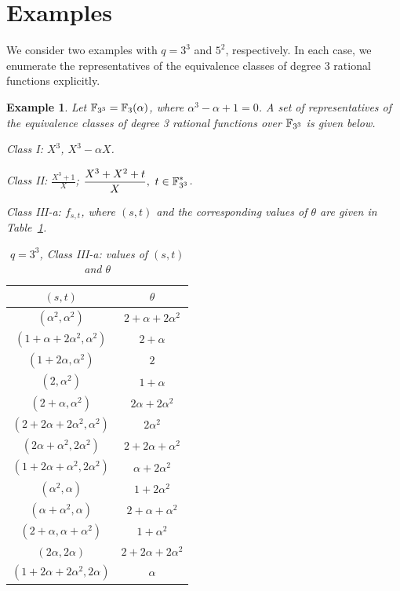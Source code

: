 \documentclass{amsart}
\newtheorem{exmp}[thm]{Example}
\numberwithin{equation}{section}
\theoremstyle{definition}
\newcommand{\f}{\Bbb F}
\newcommand{\A}{\alpha}
\begin{document}
\section{Examples}

We consider two examples with $q=3^3$ and $5^2$, respectively. In each case, we enumerate the representatives of the equivalence classes of degree 3 rational functions explicitly.

\begin{exmp}\rm
Let $\f_{3^3}=\f_3(\alpha)$, where $\alpha^3-\alpha+1=0$. A set of representatives of the equivalence classes of degree 3 rational functions over $\f_{3^3}$ is given below.

\medskip
Class I: $X^3$, $X^3-\alpha X$.

\medskip
Class II: $\displaystyle\frac{X^3+1}X$;  $\displaystyle\frac{X^3+X^2+t}X,\ t\in\f_{3^3}^*$.

\medskip
Class III-a: $f_{s,t}$, where $(s,t)$ and the corresponding values of $\theta$ are given in Table~\ref{tb:3^3-case3a}.

\begin{table}[ht]
\caption{$q=3^3$, Class III-a: values of $(s,t)$ and $\theta$}\label{tb:3^3-case3a}
   \renewcommand*{\arraystretch}{1.4}
    \centering
     \begin{tabular}{c|c}
         \hline
         $(s,t)$ & $\theta$ \\ \hline
        $(\A^2, \A^2)$ & $2 + \A + 2 \A^2$  \\
        $(1 + \A + 2 \A^2, \A^2)$ & $2 + \A$  \\
        $(1 + 2 \A, \A^2)$ & $2$ \\
        $(2, \A^2)$ & $1 + \A$ \\
        $(2 + \A, \A^2)$ & $2 \A + 2 \A^2$ \\
        $(2 + 2 \A + 2 \A^2, \A^2)$ & $ 2 \A^2$ \\
        $(2 \A + \A^2, 2 \A^2)$ & $2 + 2 \A + \A^2$ \\
        $(1 + 2 \A + \A^2, 2 \A^2)$ & $\A + 2 \A^2$ \\
        $(\A^2, \A)$ & $1 + 2 \A^2$ \\
        $(\A + \A^2, \A)$ & $2 + \A + \A^2$ \\
        $(2 + \A, \A + \A^2)$ & $1 + \A^2$ \\
        $(2 \A, 2 \A)$ & $2 + 2 \A + 2 \A^2$ \\ 
        $(1 + 2 \A + 2 \A^2, 2 \A)$ & $\A$ \\ 
         \hline
     \end{tabular}
\end{table}



\end{exmp}
\end{document}

